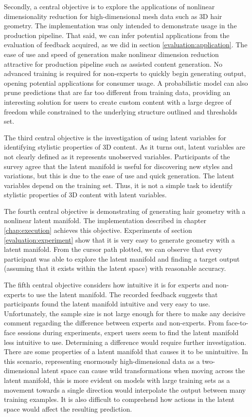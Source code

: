 \documentclass[ %
author={Dillon Keith Diep},
supervisor={Dr. Carl Henrik Ek},
degree={MEng},
title={ART-CG Hair:},
subtitle={Assisted Real-time Content Generation of Stylised Virtual Hair},
type={Research},
year={2017} ]{dissertation}
\begin{document}

Secondly, a central objective is to explore the applications of nonlinear dimensionality reduction for high-dimensional mesh data such as 3D hair geometry.
The implementation was only intended to demonstrate usage in the production pipeline. That said, we can infer potential applications from the evaluation of feedback acquired, as we did in section \ref{evaluation:application}.
The ease of use and speed of generation make nonlinear dimension reduction attractive for production pipeline such as assisted content generation.
No advanced training is required for non-experts to quickly begin generating output, opening potential applications for consumer usage.
A probabilistic model can also prune predictions that are far too different from training data, providing an interesting solution for users to create custom content with a large degree of freedom while constrained to the underlying structure outlined and thresholds set.

The third central objective is the investigation of using latent variables for identifying stylistic properties of 3D content. As it turns out, latent variables are not clearly defined as it represents unobserved variables. Participants of the survey agree that the latent manifold is useful for discovering new styles and variations, but this is due to the ease of use and quick generation. The latent variables depend on the training set. Thus, it is not a simple task to identify stylistic properties of 3D content with latent variables.

The fourth central objective is demonstrating of generating hair geometry with a nonlinear latent manifold. The implementation described in chapter \ref{chap:execution} achieves this objective. 
Experiments of section \ref{evaluation:experiment} show that it is very easy to generate geometry with a latent manifold. From the cursor path plotted, we can observe that every participant was able to explore the latent manifold and finding a target output (assuming that it exists within the latent space) with reasonable accuracy.

The fifth central objective considers how intuitive it is for experts and non-experts to use the latent manifold. The recorded feedback suggests that participants found the latent manifold intuitive and very easy to use. Unfortunately, the sample size is not large enough for there to make any decisive comment regarding the difference between experts and non-experts. From face-to-face sessions during experiments, expert users seem to find the latent manifold less intuitive to use. Determining a difference would require further investigation. There are some properties of a latent manifold that causes it to be unintuitive. In this scenario, representing enormously high-dimensional data as a two-dimensional latent space can cause wild transformations when moving across the latent manifold, this is more evident on models with large training sets as a movement towards a single direction would interpolate the output between many training examples. It is also difficult to comprehend how actions in the latent space would affect the resulting prediction.
\end{document}
